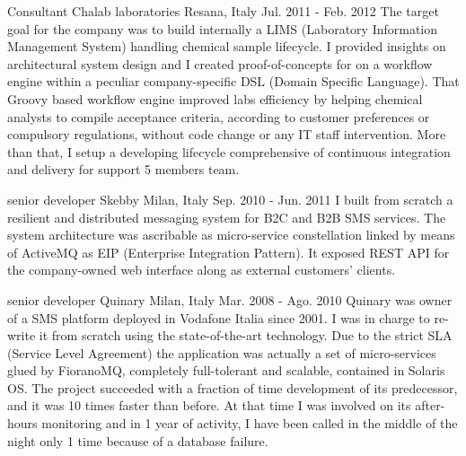 \begin{cventries}
  \cventry
    {Consultant} %
    {Chalab laboratories} %
    {Resana, Italy} %
    {Jul. 2011 - Feb. 2012} %
    {
      The target goal for the company was to build internally a LIMS (Laboratory Information Management System) handling chemical sample lifecycle.
      I provided insights on architectural system design and I created proof-of-concepts for on a workflow engine within a peculiar company-specific DSL (Domain Specific Language).
      That Groovy based workflow engine improved labs efficiency by helping chemical analysts to compile acceptance criteria, according to customer preferences or compulsory regulations,
      without code change or any IT staff intervention. More than that, I setup a developing lifecycle comprehensive of  continuous integration and delivery for support 5 members team.
    }

  \cventry
    {senior developer} %
    {Skebby} %
    {Milan, Italy} %
    {Sep. 2010 - Jun. 2011} %
    {
      I built from scratch a resilient and distributed messaging system for B2C and B2B SMS services.
      The system architecture was ascribable as micro-service constellation linked by means of ActiveMQ as EIP (Enterprise Integration Pattern).
      It exposed REST API for the company-owned web interface along as external customers' clients.
    }

  \cventry
    {senior developer} %
    {Quinary} %
    {Milan, Italy} %
    {Mar. 2008 - Ago. 2010} %
    {
      Quinary was owner of a SMS platform deployed in Vodafone Italia since 2001. I was in charge to re-write it from scratch using the state-of-the-art technology.
      Due to the strict SLA (Service Level Agreement) the application was actually a set of micro-services glued by FioranoMQ, completely full-tolerant and scalable, contained in Solaris OS.
      The project succeeded with a fraction of time development of its predecessor, and it was 10 times faster than before.
      At that time I was involved on its after-hours monitoring and in 1 year of activity, I have been called in the middle of the night only 1 time because of a database failure.
    }


\end{cventries}
